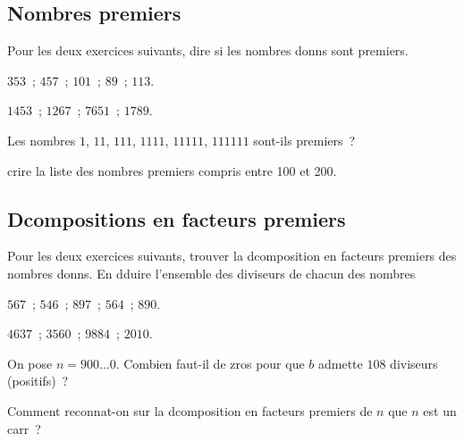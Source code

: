 \documentclass[a4paper,fleqn,openany]{trmbook}
\begin{document}
\begin{listeexercices}

\subsection{Nombres premiers}

Pour les deux exercices suivants, dire si les nombres donns sont premiers.

\begin{exercice}
$353$~; $457$~; $101$~; $89$~; $113$.
\end{exercice}

\begin{exercice}
$1453$~; $1267$~; $7651$~; $1789$.
\end{exercice}

\begin{exercice}
Les nombres $1$, $11$, $111$, $1111$, $11111$, $111111$ sont-ils premiers~?
\end{exercice}

\begin{exercice}
crire la liste des nombres premiers compris entre 100 et 200.
\end{exercice}

\subsection{Dcompositions en facteurs premiers}

Pour les deux exercices suivants, trouver la dcomposition en facteurs premiers des nombres donns. En dduire l'ensemble des diviseurs de chacun des nombres

\begin{exercice}
$567$~; $546$~; $897$~; $564$~; $890$.
\end{exercice}

\begin{exercice}
$4637$~; $3560$~; $9884$~; $2010$.
\end{exercice}

\begin{exercice}
On pose $n = 900\dots 0$. Combien faut-il de zros pour que $b$ admette $108$ diviseurs (positifs)~?
\end{exercice}

\begin{exercice}
Comment reconnat-on sur la dcomposition en facteurs premiers de $n$ que $n$ est un carr~?
\end{exercice}


\end{listeexercices}
\end{document}
